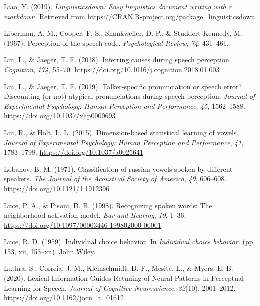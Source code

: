 \documentclass[
  11pt,
  english,
  man,floatsintext]{apa6}
\newlength{\cslhangindent}
\newlength{\cslentryspacingunit} %
\newenvironment{CSLReferences}[2] %
 {%
  \setlength{\parindent}{0pt}
  \ifodd #1
  \let\oldpar\par
  \def\par{\hangindent=\cslhangindent\oldpar}
  \fi
  \setlength{\parskip}{#2\cslentryspacingunit}
 }%
 {}
\begin{document}
\begin{CSLReferences}{1}{0}
\leavevmode{}%
Liao, Y. (2019). \emph{Linguisticsdown: Easy linguistics document writing with r markdown}. Retrieved from \url{https://CRAN.R-project.org/package=linguisticsdown}

\leavevmode{}%
Liberman, A. M., Cooper, F. S., Shankweiler, D. P., \& Studdert-Kennedy, M. (1967). Perception of the speech code. \emph{Psychological Review}, \emph{74}, 431--461.

\leavevmode{}%
Liu, L., \& Jaeger, T. F. (2018). Inferring causes during speech perception. \emph{Cognition}, \emph{174}, 55--70. \url{https://doi.org/10.1016/j.cognition.2018.01.003}

\leavevmode{}%
Liu, L., \& Jaeger, T. F. (2019). Talker-specific pronunciation or speech error? Discounting (or not) atypical pronunciations during speech perception. \emph{Journal of Experimental Psychology. Human Perception and Performance}, \emph{45}, 1562--1588. \url{https://doi.org/10.1037/xhp0000693}

\leavevmode{}%
Liu, R., \& Holt, L. L. (2015). Dimension-based statistical learning of vowels. \emph{Journal of Experimental Psychology: Human Perception and Performance}, \emph{41}, 1783--1798. \url{https://doi.org/10.1037/a0025641}

\leavevmode{}%
Lobanov, B. M. (1971). Classification of russian vowels spoken by different speakers. \emph{The Journal of the Acoustical Society of America}, \emph{49}, 606--608. \url{https://doi.org/10.1121/1.1912396}

\leavevmode{}%
Luce, P. A., \& Pisoni, D. B. (1998). Recognizing spoken words: The neighborhood activation model. \emph{Ear and Hearing}, \emph{19}, 1--36. \url{https://doi.org/10.1097/00003446-199802000-00001}

\leavevmode{}%
Luce, R. D. (1959). Individual choice behavior. In \emph{Individual choice behavior.} (pp. 153, xii, 153--xii). John Wiley.

\leavevmode{}%
Luthra, S., Correia, J. M., Kleinschmidt, D. F., Mesite, L., \& Myers, E. B. (2020). {Lexical Information Guides Retuning of Neural Patterns in Perceptual Learning for Speech}. \emph{Journal of Cognitive Neuroscience}, \emph{32}(10), 2001--2012. \url{https://doi.org/10.1162/jocn_a_01612}


\end{CSLReferences}
\end{document}
